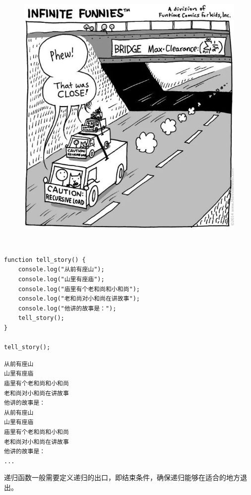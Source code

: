 \begin{figure}[H]
	\centering
	\includegraphics[scale=0.6]{img/C13/13-3/5.png}
\end{figure}

\\

\begin{lstlisting}[style=htmlcssjs]
function tell_story() {
    console.log("从前有座山");
    console.log("山里有座庙");
    console.log("庙里有个老和尚和小和尚");
    console.log("老和尚对小和尚在讲故事");
    console.log("他讲的故事是：");
    tell_story();
}

tell_story();
\end{lstlisting}

\begin{tcolorbox}
	\begin{verbatim}
从前有座山
山里有座庙
庙里有个老和尚和小和尚
老和尚对小和尚在讲故事
他讲的故事是：
从前有座山
山里有座庙
庙里有个老和尚和小和尚
老和尚对小和尚在讲故事
他讲的故事是：
...
	\end{verbatim}
\end{tcolorbox}

递归函数一般需要定义递归的出口，即结束条件，确保递归能够在适合的地方退出。\\

